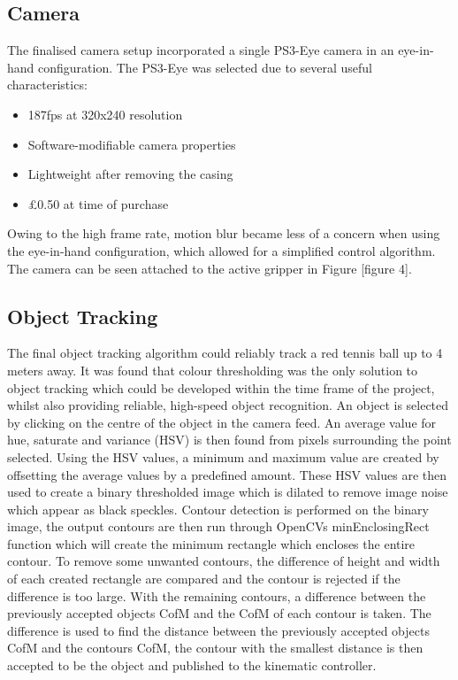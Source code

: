\documentclass[conference]{IEEEtran}
\begin{document}
\subsection{Camera}\label{camera}
The finalised camera setup incorporated a single PS3-Eye camera in an eye-in-hand configuration. The PS3-Eye was selected due to several useful characteristics:
\begin{itemize}
	\item 187fps at 320x240 resolution
	
	\item Software-modifiable camera properties
	
	\item Lightweight after removing the casing
	
	\item \pounds0.50 at time of purchase
\end{itemize}

Owing to the high frame rate, motion blur became less of a concern when using the eye-in-hand configuration, which allowed for a simplified control algorithm. The camera can be seen attached to the active gripper in Figure [figure 4].

\subsection{Object Tracking}
The final object tracking algorithm could reliably track a red tennis ball up to 4 meters away. It was found that colour thresholding was the only solution to object tracking which could be developed within the time frame of the project, whilst also providing reliable, high-speed object recognition. An object is selected by clicking on the centre of the object in the camera feed. An average value for hue, saturate and variance (HSV) is then found from pixels surrounding the point selected. Using the HSV values, a minimum and maximum value are created by offsetting the average values by a predefined amount. These HSV values are then used to create a binary thresholded image which is dilated to remove image noise which appear as black speckles. Contour detection is performed on the binary image, the output contours are then run through OpenCVs minEnclosingRect function which will create the minimum rectangle which encloses the entire contour. To remove some unwanted contours, the difference of height and width of each created rectangle are compared and the contour is rejected if the difference is too large. With the remaining contours, a difference between the previously accepted objects CofM and the CofM of each contour is taken. The difference is used to find the distance between the previously accepted objects CofM and the contours CofM, the contour with the smallest distance is then accepted to be the object and published to the kinematic controller.
\end{document}
